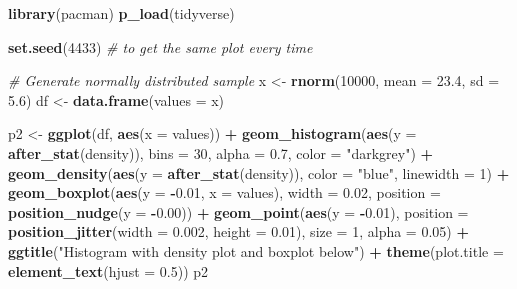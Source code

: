\documentclass[
]{book}
\newenvironment{Shaded}{\begin{snugshade}}{\end{snugshade}}
\newcommand{\AttributeTok}[1]{\textcolor[rgb]{0.13,0.29,0.53}{#1}}
\newcommand{\CommentTok}[1]{\textcolor[rgb]{0.56,0.35,0.01}{\textit{#1}}}
\newcommand{\DecValTok}[1]{\textcolor[rgb]{0.00,0.00,0.81}{#1}}
\newcommand{\FloatTok}[1]{\textcolor[rgb]{0.00,0.00,0.81}{#1}}
\newcommand{\FunctionTok}[1]{\textcolor[rgb]{0.13,0.29,0.53}{\textbf{#1}}}
\newcommand{\NormalTok}[1]{#1}
\newcommand{\OtherTok}[1]{\textcolor[rgb]{0.56,0.35,0.01}{#1}}
\newcommand{\SpecialCharTok}[1]{\textcolor[rgb]{0.81,0.36,0.00}{\textbf{#1}}}
\newcommand{\StringTok}[1]{\textcolor[rgb]{0.31,0.60,0.02}{#1}}
\begin{document}
\begin{Shaded}
\begin{Highlighting}[]
\FunctionTok{library}\NormalTok{(pacman)}
\FunctionTok{p\_load}\NormalTok{(tidyverse)}

\FunctionTok{set.seed}\NormalTok{(}\DecValTok{4433}\NormalTok{) }\CommentTok{\# to get the same plot every time}

\CommentTok{\# Generate normally distributed sample}
\NormalTok{x }\OtherTok{\textless{}{-}} \FunctionTok{rnorm}\NormalTok{(}\DecValTok{10000}\NormalTok{, }\AttributeTok{mean =} \FloatTok{23.4}\NormalTok{, }\AttributeTok{sd =} \FloatTok{5.6}\NormalTok{)}
\NormalTok{df }\OtherTok{\textless{}{-}} \FunctionTok{data.frame}\NormalTok{(}\AttributeTok{values =}\NormalTok{ x)}

\NormalTok{p2 }\OtherTok{\textless{}{-}} \FunctionTok{ggplot}\NormalTok{(df, }\FunctionTok{aes}\NormalTok{(}\AttributeTok{x =}\NormalTok{ values)) }\SpecialCharTok{+}
  \FunctionTok{geom\_histogram}\NormalTok{(}\FunctionTok{aes}\NormalTok{(}\AttributeTok{y =} \FunctionTok{after\_stat}\NormalTok{(density)),}
                 \AttributeTok{bins =} \DecValTok{30}\NormalTok{, }\AttributeTok{alpha =} \FloatTok{0.7}\NormalTok{, }\AttributeTok{color =} \StringTok{"darkgrey"}\NormalTok{) }\SpecialCharTok{+}
  \FunctionTok{geom\_density}\NormalTok{(}\FunctionTok{aes}\NormalTok{(}\AttributeTok{y =} \FunctionTok{after\_stat}\NormalTok{(density)), }\AttributeTok{color =} \StringTok{"blue"}\NormalTok{, }\AttributeTok{linewidth =} \DecValTok{1}\NormalTok{) }\SpecialCharTok{+}
  \FunctionTok{geom\_boxplot}\NormalTok{(}\FunctionTok{aes}\NormalTok{(}\AttributeTok{y =} \SpecialCharTok{{-}}\FloatTok{0.01}\NormalTok{, }\AttributeTok{x =}\NormalTok{ values),}
               \AttributeTok{width =} \FloatTok{0.02}\NormalTok{, }\AttributeTok{position =} \FunctionTok{position\_nudge}\NormalTok{(}\AttributeTok{y =} \SpecialCharTok{{-}}\FloatTok{0.00}\NormalTok{)) }\SpecialCharTok{+}
  \FunctionTok{geom\_point}\NormalTok{(}\FunctionTok{aes}\NormalTok{(}\AttributeTok{y =} \SpecialCharTok{{-}}\FloatTok{0.01}\NormalTok{),}
             \AttributeTok{position =} \FunctionTok{position\_jitter}\NormalTok{(}\AttributeTok{width =} \FloatTok{0.002}\NormalTok{, }\AttributeTok{height =} \FloatTok{0.01}\NormalTok{),}
             \AttributeTok{size =} \DecValTok{1}\NormalTok{, }\AttributeTok{alpha =} \FloatTok{0.05}\NormalTok{) }\SpecialCharTok{+}
  \FunctionTok{ggtitle}\NormalTok{(}\StringTok{"Histogram with density plot and boxplot below"}\NormalTok{) }\SpecialCharTok{+}
  \FunctionTok{theme}\NormalTok{(}\AttributeTok{plot.title =} \FunctionTok{element\_text}\NormalTok{(}\AttributeTok{hjust =} \FloatTok{0.5}\NormalTok{))}
\NormalTok{p2}
\end{Highlighting}
\end{Shaded}
\end{document}
